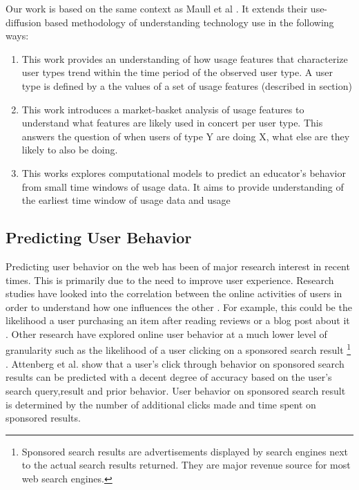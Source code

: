 \documentclass{acm_proc_article-sp}
\begin{document}
Our work is based on the same context as Maull et al \cite{maullunderstanding}. It extends their use-diffusion based methodology of understanding technology use in the following ways: 
\begin{enumerate}
\item This work provides an understanding of how usage features that characterize user types trend within the time period of the observed user type. A user type is defined by a the values of a set of usage features (described in section)

\item This work introduces a market-basket analysis of usage features to understand what features are likely used in concert per user type. This answers the question of when users of type Y are doing X, what else are they likely to also be doing.

\item This works explores computational models to predict an educator's behavior from small time windows of usage data. It aims to provide understanding of the earliest time window of usage data and usage
\end{enumerate}

\subsection{Predicting User Behavior}
Predicting user behavior on the web has been of major research interest in recent times. This is primarily due to the need to improve user experience.  Research studies have looked into the correlation between  the online activities of users in order to understand how one influences the other \cite{adar2007we}. For example, this could be the likelihood a user purchasing an item after reading reviews or a blog post about it \cite{adar2007we}. Other research have explored online user behavior at a much lower level of granularity such as the likelihood of a user clicking on a sponsored search result \footnote{Sponsored search results are advertisements displayed by search engines next to the actual search results returned. They are major revenue source for most web search engines.} \cite{Attenberg:2009}. Attenberg et al. \cite{Attenberg:2009} show that a user's click through behavior on sponsored search results can be predicted with a decent degree of accuracy based on the user's search query,result and prior behavior. User behavior on sponsored search result is determined by the number of additional clicks made and time spent on sponsored results.
\end{document}
